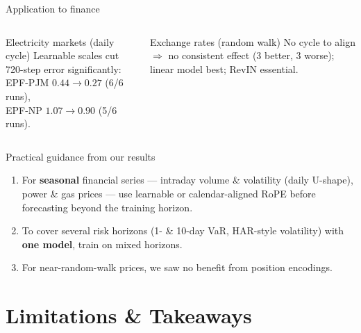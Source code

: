 \documentclass[aspectratio=169,xcolor=dvipsnames]{beamer}
\begin{document}
\begin{frame}{Application to finance}
\begin{columns}[T]
\begin{block}{Electricity markets (daily cycle)}
\small Learnable scales cut 720-step error significantly:\\
EPF-PJM $0.44\to\mathbf{0.27}$ (6/6 runs),\\
EPF-NP $1.07\to\mathbf{0.90}$ (5/6 runs).
\end{block}
\begin{block}{Exchange rates (random walk)}
\small No cycle to align $\Rightarrow$ no consistent effect (3 better, 3 worse); linear model best; RevIN essential.
\end{block}
\end{columns}
\vspace{0.2cm}
\begin{alertblock}{Practical guidance from our results}
\begin{enumerate}\small
\item For \textbf{seasonal} financial series --- intraday volume \& volatility (daily U-shape), power \& gas prices --- use learnable or calendar-aligned RoPE before forecasting beyond the training horizon.
\item To cover several risk horizons (1- \& 10-day VaR, HAR-style volatility) with \textbf{one model}, train on mixed horizons.
\item For near-random-walk prices, we saw no benefit from position encodings.
\end{enumerate}
\end{alertblock}
\end{frame}

\section{Limitations \& Takeaways}
\end{document}
